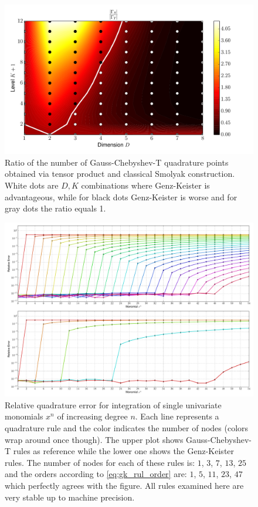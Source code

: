 \documentclass[a4paper,10pt]{article}
\begin{document}
\begin{figure}[h]
  \centering
  \includegraphics[width=0.8\linewidth]{./img/smol_chebyshevt_ratio.pdf}
  \caption{Ratio of the number of Gauss-Chebyshev-T quadrature points obtained
  via tensor product and classical Smolyak construction. White dots are $D,K$
  combinations where Genz-Keister is advantageous, while for black dots
  Genz-Keister is worse and for gray dots the ratio equals 1.}
  \label{fig:smol_chebyshevt_ratio}
\end{figure}

\begin{figure}
  \centering
  \includegraphics[width=\linewidth]{./img/monomial_errors_chebyshevt.pdf}
  \caption{Relative quadrature error for integration of single univariate monomials $x^n$ of increasing degree $n$.
  Each line represents a quadrature rule and the color indicates the number of nodes (colors wrap around once though).
  The upper plot shows Gauss-Chebyshev-T rules as reference while the lower one shows the Genz-Keister rules.
  The number of nodes for each of these rules is:
  $1$, $3$,  $7$, $13$, $25$ and the orders according to \eqref{eq:gk_rul_order} are:
  $1$, $5$, $11$, $23$, $47$ which perfectly agrees with the figure.
  All rules examined here are very stable up to machine precision.}
  \label{fig:monomial_errors_chebyshevt}
\end{figure}
\end{document}

